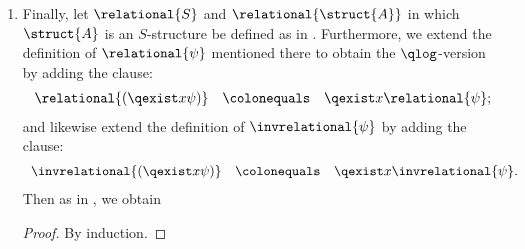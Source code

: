 \begin{enumerate}[1.]
\begin{enumerate}[(1)]
\begin{theorem}{Relativization Lemma for $\qlog$}
\end{theorem}
\begin{proof}
By induction.
\end{proof}
\item Finally, let $\relational{S}$ and $\relational{\struct{A}}$ in which $\struct{A}$ is an $S$-structure be defined as in . Furthermore, we extend the definition of $\relational{\psi}$ mentioned there to obtain the $\qlog$-version by adding the clause:
\[
\begin{array}{lll}
\relational{(\qexist x \psi)} & \colonequals & \qexist x \relational{\psi};
\end{array}
\]
and likewise extend the definition of $\invrelational{\psi}$ by adding the clause:
\[
\begin{array}{lll}
\invrelational{(\qexist x \psi)} & \colonequals & \qexist x \invrelational{\psi}.
\end{array}
\]
Then as in , we obtain\medskip\\
\begin{proof}
By induction.
\end{proof}


\end{enumerate}
\end{enumerate}
